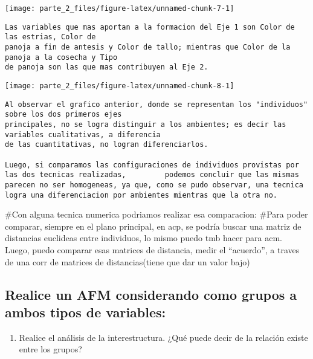 \documentclass[
]{article}
\providecommand{\tightlist}{%
  \setlength{\itemsep}{0pt}\setlength{\parskip}{0pt}}
\begin{document}
\begin{center}\texttt{[image: parte\_2\_files/figure-latex/unnamed-chunk-7-1]} \end{center}

\begin{verbatim}
Las variables que mas aportan a la formacion del Eje 1 son Color de las estrias, Color de 
panoja a fin de antesis y Color de tallo; mientras que Color de la panoja a la cosecha y Tipo 
de panoja son las que mas contribuyen al Eje 2.
\end{verbatim}

\begin{center}\texttt{[image: parte\_2\_files/figure-latex/unnamed-chunk-8-1]} \end{center}

\begin{verbatim}
Al observar el grafico anterior, donde se representan los "individuos" sobre los dos primeros ejes 
principales, no se logra distinguir a los ambientes; es decir las variables cualitativas, a diferencia
de las cuantitativas, no logran diferenciarlos.

Luego, si comparamos las configuraciones de individuos provistas por las dos tecnicas realizadas,         podemos concluir que las mismas parecen no ser homogeneas, ya que, como se pudo observar, una tecnica     logra una diferenciacion por ambientes mientras que la otra no.
\end{verbatim}

\#Con alguna tecnica numerica podriamos realizar esa comparacion: \#Para
poder comparar, siempre en el plano principal, en acp, se podría buscar
una matriz de distancias euclideas entre individuos, lo mismo puedo tmb
hacer para acm. Luego, puedo comparar esas matrices de distancia, medir
el ``acuerdo'', a traves de una corr de matrices de distancias(tiene que
dar un valor bajo)

\hypertarget{realice-un-afm-considerando-como-grupos-a-ambos-tipos-de-variables}{%
\subsection{Realice un AFM considerando como grupos a ambos tipos de
variables:}\label{realice-un-afm-considerando-como-grupos-a-ambos-tipos-de-variables}}

\begin{enumerate}
\def\labelenumi{\alph{enumi})}
\setcounter{enumi}{2}
\tightlist
\item
  Realice el análisis de la interestructura. ¿Qué puede decir de la
  relación existe entre los grupos?
\end{enumerate}
\end{document}
